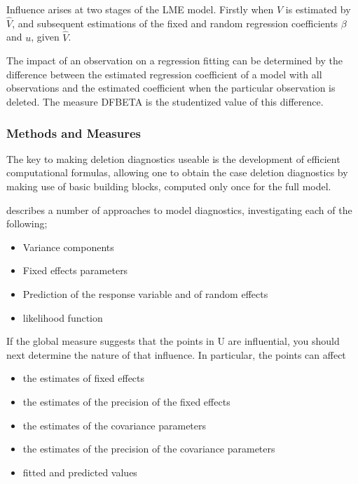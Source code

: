 \documentclass[12pt, a4paper]{report}
\theoremstyle{plain}
\theoremstyle{definition}
\theoremstyle{remark}
\begin{document}
	Influence arises at two stages of the LME model. Firstly when $V$ is estimated by $\hat{V}$, and subsequent
	estimations of the fixed and random regression coefficients $\beta$ and $u$, given $\hat{V}$.
	
	The impact of an observation on a regression fitting can be determined by the difference between the estimated regression coefficient of a model with all observations and the estimated coefficient when the particular observation is deleted. The measure DFBETA is the studentized value of this difference.
	
	\subsubsection{Methods and Measures}
	The key to making deletion diagnostics useable is the development of efficient computational formulas, allowing one to obtain the  case deletion diagnostics by making use of basic building blocks, computed only once for the full model.
	
	\citet{Zewotir} describes a number of approaches to model diagnostics, investigating each of the following;
	\begin{itemize}
		\item Variance components
		\item Fixed effects parameters
		\item Prediction of the response variable and of random effects
		\item likelihood function
	\end{itemize}
	If the global measure suggests that the points in U are influential, you should next determine the nature of
	that influence. In particular, the points can affect
	\begin{itemize}
		\item the estimates of fixed effects
		\item the estimates of the precision of the fixed effects
		\item the estimates of the covariance parameters
		\item the estimates of the precision of the covariance parameters
		\item fitted and predicted values
	\end{itemize}
	
\end{document}
